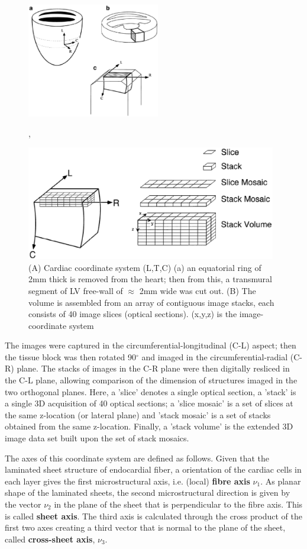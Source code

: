 \begin{figure}[hbt]
  \centerline{\includegraphics[height=5cm,
    angle=0]{./images/cardiac_coordinate.eps}},
      \centerline{\includegraphics[height=5cm,
    angle=0]{./images/cardiac_segments.eps}}    
  \caption{(A) Cardiac coordinate system (L,T,C) (a) an equatorial ring of 2mm
  thick is removed from the heart; then from this, a transmural segment of LV
  free-wall of $\approx$ 2mm wide was cut out.
  (B) The volume is assembled from an array of contiguous image stacks, each consists of 40 image slices
  (optical sections). (x,y,z) is the image-coordinate system}
  \label{fig:cardiac_coordinate}
\end{figure}

The images were captured in the circumferential-longitudinal (C-L) aspect; then
the tissue block was then rotated 90$^\circ$ and imaged in the
circumferential-radial (C-R) plane. The stacks of images in the C-R plane were
then digitally resliced in the C-L plane, allowing comparison of the dimension
of structures imaged in the two orthogonal planes. Here, a 'slice' denotes a
single optical section, a 'stack' is a single 3D acquisition of 40 optical
sections; a 'slice mosaic' is a set of slices at the same z-location (or
lateral plane) and 'stack mosaic' is a set of stacks obtained from the same
z-location. Finally, a 'stack volume' is the extended 3D image data set built
upon the set of stack mosaics.
 

The axes of this coordinate system are defined as follows. Given that the
laminated sheet structure of endocardial fiber, a orientation of the cardiac
cells in each layer gives the first microstructural axis, i.e. (local) {\bf
fibre axis} $\nu_1$. As planar shape of the laminated sheets, the second
microstructural direction is given by the vector $\nu_2$ in the plane of the
sheet that is  perpendicular to the fibre axis. This is called {\bf sheet axis}.
The third axis is calculated through the cross product of the first two axes
creating a third vector that is normal to the plane of the sheet, called {\bf
cross-sheet axis}, $\nu_3$.

